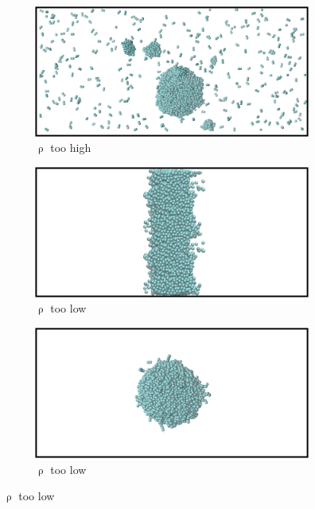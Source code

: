 \documentclass{scrbook}
\begin{document}
\begin{figure}
	\centering
	\begin{subfigure}{0.4\textwidth} %
    \includegraphics[width=1\textwidth]{gfx/image70.png} 
    \caption{${\uprho}$ too high}
	\end{subfigure}
	\begin{subfigure}{0.4\textwidth} %
    \includegraphics[width=1\textwidth]{gfx/image71.png}
    \caption{${\uprho}$ too low}
	\end{subfigure}
	\begin{subfigure}{0.4\textwidth} %
    \includegraphics[width=1\textwidth]{gfx/image72.png}
    \caption{${\uprho}$ too low}

\end{subfigure}
\end{figure}
\end{document}
